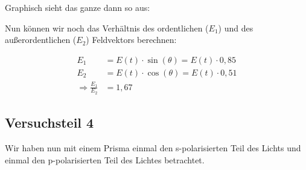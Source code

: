 Graphisch sieht das ganze dann so aus:


\begin{figure}[H]
\end{figure}


Nun können wir noch das Verhältnis des ordentlichen ($E_1$) und des außerordentlichen ($E_2$) Feldvektors berechnen:

\begin{align*}
E_1 &= E(t) \cdot \sin(\theta) = E(t) \cdot 0,85 \\
E_2 &= E(t) \cdot \cos(\theta) = E(t) \cdot 0,51 \\
\Rightarrow \frac{E_1}{E_2} &= 1,67
\end{align*}


\newpage


\subsection*{Versuchsteil 4}

Wir haben nun mit einem Prisma einmal den s-polarisierten Teil des Lichts und einmal den p-polarisierten Teil des Lichtes betrachtet. 




